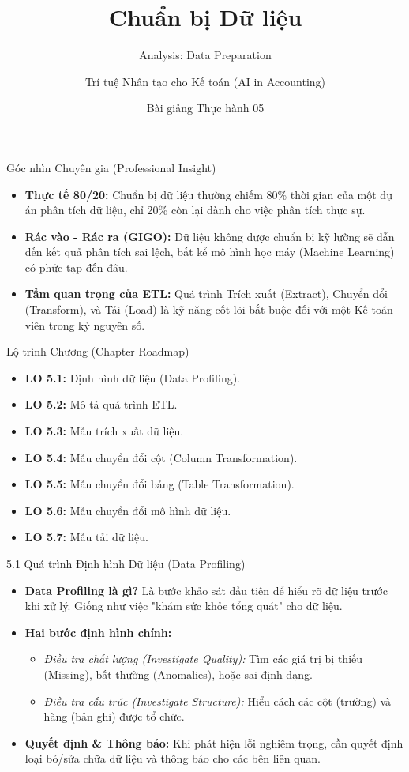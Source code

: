 \documentclass[aspectratio=169,12pt]{beamer}
\title[Thực hành - Chương 05]{Chuẩn bị Dữ liệu}
\subtitle{Analysis: Data Preparation}
\author[Giảng viên]{Trí tuệ Nhân tạo cho Kế toán (AI in Accounting)}
\institute[Đại học]{Khoa Kế toán - Kiểm toán}
\date{Bài giảng Thực hành 05}
\begin{document}
\begin{frame}
    \titlepage
\end{frame}

\begin{frame}{Góc nhìn Chuyên gia (Professional Insight)}
\begin{itemize}
    \item \textbf{Thực tế 80/20:} Chuẩn bị dữ liệu thường chiếm 80\% thời gian của một dự án phân tích dữ liệu, chỉ 20\% còn lại dành cho việc phân tích thực sự.
    \item \textbf{Rác vào - Rác ra (GIGO):} Dữ liệu không được chuẩn bị kỹ lưỡng sẽ dẫn đến kết quả phân tích sai lệch, bất kể mô hình học máy (Machine Learning) có phức tạp đến đâu.
    \item \textbf{Tầm quan trọng của ETL:} Quá trình Trích xuất (Extract), Chuyển đổi (Transform), và Tải (Load) là kỹ năng cốt lõi bắt buộc đối với một Kế toán viên trong kỷ nguyên số.
\end{itemize}
\end{frame}

\begin{frame}{Lộ trình Chương (Chapter Roadmap)}
\begin{itemize}
    \item \textbf{LO 5.1:} Định hình dữ liệu (Data Profiling).
    \item \textbf{LO 5.2:} Mô tả quá trình ETL.
    \item \textbf{LO 5.3:} Mẫu trích xuất dữ liệu.
    \item \textbf{LO 5.4:} Mẫu chuyển đổi cột (Column Transformation).
    \item \textbf{LO 5.5:} Mẫu chuyển đổi bảng (Table Transformation).
    \item \textbf{LO 5.6:} Mẫu chuyển đổi mô hình dữ liệu.
    \item \textbf{LO 5.7:} Mẫu tải dữ liệu.
\end{itemize}
\end{frame}

\begin{frame}{5.1 Quá trình Định hình Dữ liệu (Data Profiling)}
\begin{itemize}
    \item \textbf{Data Profiling là gì?} Là bước khảo sát đầu tiên để hiểu rõ dữ liệu trước khi xử lý. Giống như việc "khám sức khỏe tổng quát" cho dữ liệu.
    \item \textbf{Hai bước định hình chính:}
    \begin{itemize}
        \item \textit{Điều tra chất lượng (Investigate Quality):} Tìm các giá trị bị thiếu (Missing), bất thường (Anomalies), hoặc sai định dạng.
        \item \textit{Điều tra cấu trúc (Investigate Structure):} Hiểu cách các cột (trường) và hàng (bản ghi) được tổ chức.
    \end{itemize}
    \item \textbf{Quyết định \& Thông báo:} Khi phát hiện lỗi nghiêm trọng, cần quyết định loại bỏ/sửa chữa dữ liệu và thông báo cho các bên liên quan.
\end{itemize}
\end{frame}
\end{document}
